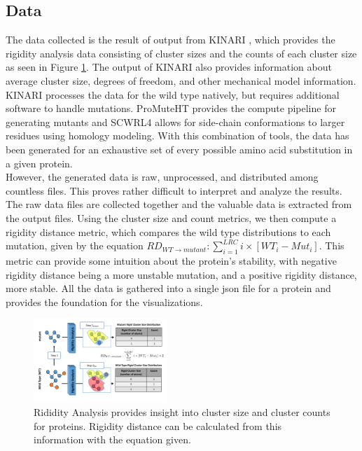 \documentclass[11pt]{IEEEtran}
\begin{document}
\subsection{Data}\label{AA}
The data collected is the result of output from KINARI \cite{b1}, which provides the rigidity analysis data consisting of cluster sizes and the counts of each cluster size as seen in Figure \ref{fig:rigidityAnalysis}. The output of KINARI also provides information about average cluster size, degrees of freedom, and other mechanical model information. KINARI processes the data for the wild type natively, but requires additional software to handle mutations. ProMuteHT \cite{b5} provides the compute pipeline for generating mutants and SCWRL4 \cite{b6} allows for side-chain conformations to larger residues using homology modeling. With this combination of tools, the data has been generated for an exhaustive set of every possible amino acid substitution in a given protein.\\

However, the generated data is raw, unprocessed, and distributed among countless files. This proves rather difficult to interpret and analyze the results. The raw data files are collected together and the valuable data is extracted from the output files. Using the cluster size and count metrics, we then compute a rigidity distance metric, which compares the wild type distributions to each mutation, given by the equation $RD_{WT \rightarrow mutant} : \sum_{i=1}^{LRC} i \times [WT_i - Mut_i]$. This metric can provide some intuition about the protein's stability, with negative rigidity distance being a more unstable mutation, and a positive rigidity distance, more stable. All the data is gathered into a single json file for a protein and provides the foundation for the visualizations.

\begin{figure}[ht]
  \center
  \includegraphics[width=0.45\textwidth]{figs/rigidityCompare.pdf}
  \caption{Rididity Analysis provides insight into cluster size and cluster counts for proteins. Rigidity distance can be calculated from this information with the equation given.}
  \label{fig:rigidityAnalysis}
\end{figure}
\end{document}
